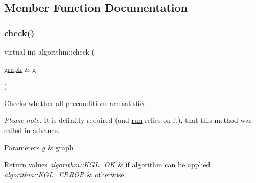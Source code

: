\subsection{Member Function Documentation}
\mbox{\label{classalgorithm_a76361fb03ad1cf643affc51821e43bed}} 
\subsubsection{\texorpdfstring{check()}{check()}}
{\footnotesize\ttfamily virtual int algorithm\+::check (\begin{DoxyParamCaption}\item[{\mbox{\hyperlink{classgraph}{graph}} \&}]{g }\end{DoxyParamCaption})\hspace{0.3cm}{\ttfamily [pure virtual]}}



Checks whether all preconditions are satisfied. 

{\itshape Please} {\itshape note\+:} It is definitly required (and \mbox{\hyperlink{classalgorithm_a734b189509a8d6b56b65f8ff772d43ca}{run}} relies on it), that this method was called in advance.


\begin{DoxyParams}{Parameters}
{\em g} & graph \\
\hline
\end{DoxyParams}

\begin{DoxyRetVals}{Return values}
{\em \mbox{\hyperlink{classalgorithm_af1a0078e153aa99c24f9bdf0d97f6710aae4c1cd7fe8d8cf4b143241a6e7c31cf}{algorithm\+::\+K\+G\+L\+\_\+\+OK}}} & if algorithm can be applied \\
\hline
{\em \mbox{\hyperlink{classalgorithm_af1a0078e153aa99c24f9bdf0d97f6710ae67bf27b2ef31f73e545a7f9f4a69556}{algorithm\+::\+K\+G\+L\+\_\+\+E\+R\+R\+OR}}} & otherwise. \\
\hline
\end{DoxyRetVals}


